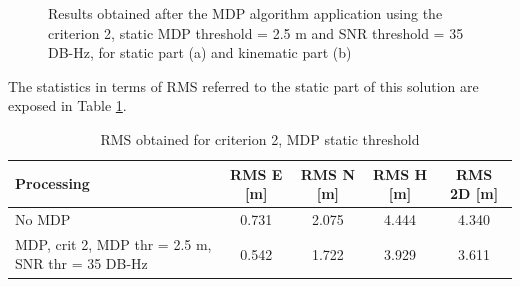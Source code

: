 \begin{figure}[H] 
	\centering
    \caption{Results obtained after the MDP algorithm application using the criterion 2, static MDP threshold = 2.5 m and SNR threshold = 35 DB-Hz, for static part (a) and kinematic part (b)}
	\label{FIG:test3mdp_crit2m25s35} 
\end{figure}

The statistics in terms of RMS referred to the static part of this solution are exposed in Table \ref{tab:test3mpd_crit2_mdp_static}.

\begin{table}[H]
	\centering
	\begin{tabular}{|p{4.5cm}|c|c|c|c|}
	\hline
	\textbf{Processing} & \textbf{RMS E [m]} & \textbf{RMS N [m]} &
	\textbf{RMS H [m]}&
	\textbf{RMS 2D [m]}\\
    \hline
	No MDP & 0.731 & 2.075& 4.444&4.340\\  
    \hline
	 MDP, crit 2, MDP thr = 2.5 m, SNR thr = 35 DB-Hz& 0.542 &1.722&3.929&3.611\\ \hline
	\end{tabular} 
	\caption{RMS obtained for criterion 2, MDP static threshold}
	\label{tab:test3mpd_crit2_mdp_static}
\end{table}

